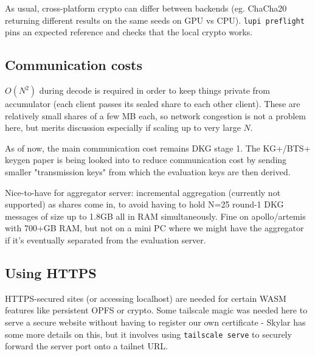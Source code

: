 \documentclass{article}
\begin{document}
As usual, cross-platform crypto can differ between backends (eg. ChaCha20 returning different results on the same seeds on GPU vs CPU). \verb|lupi preflight| pins an expected reference and checks that the local crypto works.


\subsection{Communication costs}
$O(N^2)$ during decode is required in order to keep things private from accumulator (each client passes its sealed share to each other client).
These are relatively small shares of a few MB each, so network congestion is not a problem here, but merits discussion especially if scaling up to very large $N$.

As of now, the main communication cost remains DKG stage 1.
The KG+/BTS+ keygen paper is being looked into to reduce communication cost by sending smaller "transmission keys" from which the evaluation keys are then derived.

Nice-to-have for aggregator server: incremental aggregation (currently not supported) as shares come in, to avoid having to hold N=25 round-1 DKG messages of size up to 1.8GB all in RAM simultaneously. Fine on apollo/artemis with 700+GB RAM, but not on a mini PC where we might have the aggregator if it's eventually separated from the evaluation server.

\subsection{Using HTTPS}
HTTPS-secured sites (or accessing localhost) are needed for certain WASM features like persistent OPFS or crypto. 
Some tailscale magic was needed here to serve a secure website without having to register our own certificate - Skylar has some more details on this, but it involves using \verb|tailscale serve| to securely forward the server port onto a tailnet URL.





\end{document}

